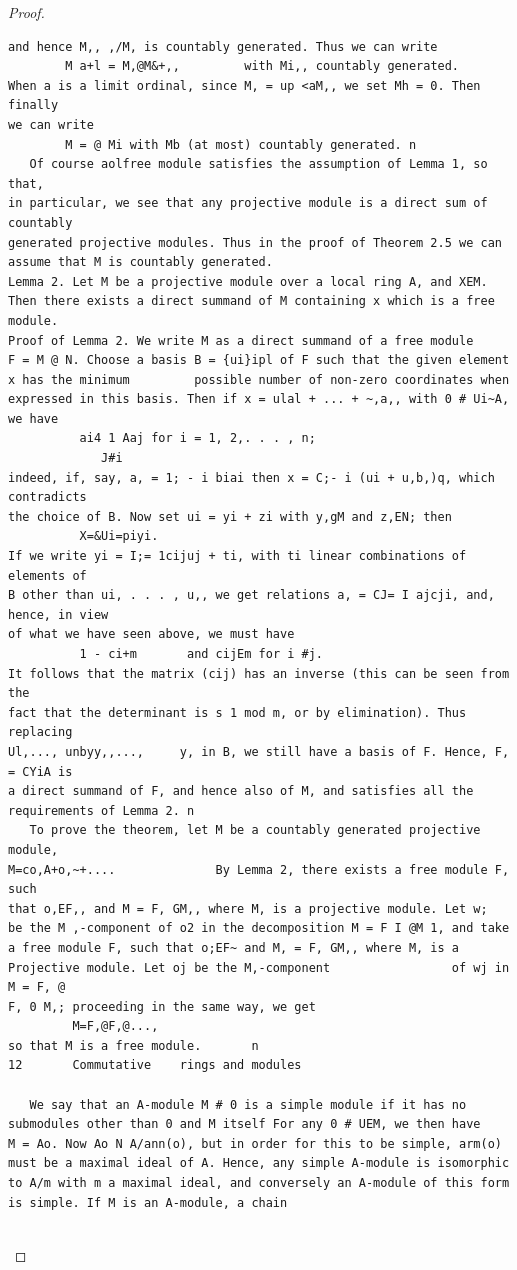 \begin{proof}
\begin{verbatim}
and hence M,, ,/M, is countably generated. Thus we can write
        M a+l = M,@M&+,,         with Mi,, countably generated.
When a is a limit ordinal, since M, = up <aM,, we set Mh = 0. Then finally
we can write
        M = @ Mi with Mb (at most) countably generated. n
   Of course aolfree module satisfies the assumption of Lemma 1, so that,
in particular, we see that any projective module is a direct sum of countably
generated projective modules. Thus in the proof of Theorem 2.5 we can
assume that M is countably generated.
Lemma 2. Let M be a projective module over a local ring A, and XEM.
Then there exists a direct summand of M containing x which is a free
module.
Proof of Lemma 2. We write M as a direct summand of a free module
F = M @ N. Choose a basis B = {ui}ipl of F such that the given element
x has the minimum         possible number of non-zero coordinates when
expressed in this basis. Then if x = ulal + ... + ~,a,, with 0 # Ui~A, we have
          ai4 1 Aaj for i = 1, 2,. . . , n;
             J#i
indeed, if, say, a, = 1; - i biai then x = C;- i (ui + u,b,)q, which contradicts
the choice of B. Now set ui = yi + zi with y,gM and z,EN; then
          X=&Ui=piyi.
If we write yi = I;= 1cijuj + ti, with ti linear combinations of elements of
B other than ui, . . . , u,, we get relations a, = CJ= I ajcji, and, hence, in view
of what we have seen above, we must have
          1 - ci+m       and cijEm for i #j.
It follows that the matrix (cij) has an inverse (this can be seen from the
fact that the determinant is s 1 mod m, or by elimination). Thus replacing
Ul,..., unbyy,,...,     y, in B, we still have a basis of F. Hence, F, = CYiA is
a direct summand of F, and hence also of M, and satisfies all the
requirements of Lemma 2. n
   To prove the theorem, let M be a countably generated projective module,
M=co,A+o,~+....              By Lemma 2, there exists a free module F, such
that o,EF,, and M = F, GM,, where M, is a projective module. Let w;
be the M ,-component of o2 in the decomposition M = F I @M 1, and take
a free module F, such that o;EF~ and M, = F, GM,, where M, is a
Projective module. Let oj be the M,-component                 of wj in M = F, @
F, 0 M,; proceeding in the same way, we get
         M=F,@F,@...,
so that M is a free module.       n
12       Commutative    rings and modules

   We say that an A-module M # 0 is a simple module if it has no
submodules other than 0 and M itself For any 0 # UEM, we then have
M = Ao. Now Ao N A/ann(o), but in order for this to be simple, arm(o)
must be a maximal ideal of A. Hence, any simple A-module is isomorphic
to A/m with m a maximal ideal, and conversely an A-module of this form
is simple. If M is an A-module, a chain


\end{verbatim}
\end{proof}
